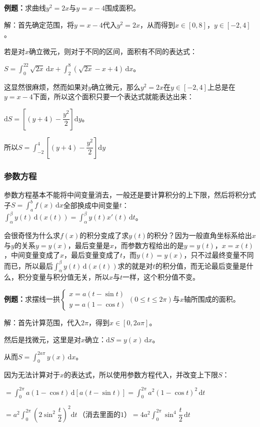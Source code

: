 \documentclass[UTF8, 12pt]{ctexart}
\begin{document}
\textbf{例题：}求曲线$y^2=2x$与$y=x-4$围成面积。

解：首先确定范围，将$y=x-4$代入$y^2=2x$，从而得到$x\in[0,8]$，$y\in[-2,4]$。

若是对$x$确立微元，则对于不同的区间，面积有不同的表达式：

$S=\int_0^22\sqrt{2x}\,\textrm{d}x+\int_2^8(\sqrt{2x}-x+4)\,\textrm{d}x$。

这显然很麻烦，然而如果对$y$确立微元，那么$y^2=2x$在$y\in[-2,4]$上总是在$y=x-4$下面，所以这个面积只要一个表达式就能表达出来：

$\textrm{d}S=\left[(y+4)-\dfrac{y^2}{2}\right]\textrm{d}y$。

所以$S=\displaystyle{\int_{-2}^4\left[(y+4)-\dfrac{y^2}{2}\right]\textrm{d}y}$

\subsubsection{参数方程}

参数方程基本不能将中间变量消去，一般还是要计算积分的上下限，然后将积分式子$S=\int_a^bf(x)\,\textrm{d}x$全部换成中间变量$t$：$\int_\alpha^\beta y(t)\,\textrm{d}(x(t))=\int_\alpha^\beta y(t)x'(t)\,\textrm{d}t$。

会很奇怪为什么求$f(x)$的积分变成了求$y(t)$的积分？因为一般直角坐标系给出$x$与$y$的关系$y=y(x)$，最后变量是$x$，而参数方程给出的是$y=y(t)$，$x=x(t)$，中间变量变成了$x$，最后变量变成了$t$，而$y(t)=y(x)$，只不过最终变量不同而已，所以最后$\int_\alpha^\beta y(t)\,\textrm{d}(x(t))$求的就是对$t$的积分值，而无论最后变量是什么，积分变量与积分值无关，所以$x$与$t$一样，这个积分值不变。

\textbf{例题：}求摆线一拱$\left\{\begin{array}{l}
    x=a(t-\sin t) \\
    y=a(1-\cos t)
\end{array}
\right.$$(0\leqslant t\leqslant 2\pi)$与$x$轴所围成的面积。\medskip

解：首先计算范围，代入$2\pi$，得到$x\in[0,2a\pi]$。

然后是找微元，这里是对$x$确立：$\textrm{d}S=y(x)\,\textrm{d}x$。

从而$S=\int_0^{2a\pi}y(x)\,\textrm{d}x$。

因为无法计算对于$x$的表达式，所以使用参数方程代入，并改变上下限$S$：

$=\int_0^{2\pi}a(1-\cos t)\,\textrm{d}[a(t-\sin t)]=\int_0^{2\pi}a^2(1-\cos t)^2\,\textrm{d}t$

$=a^2\displaystyle{\int_0^{2\pi}\left(2\sin^2\dfrac{t}{2}\right)^2\textrm{d}t}\,\text{（消去里面的1）}=4a^2\displaystyle{\int_0^{2\pi}\sin^4\dfrac{t}{2}\,\textrm{d}t}$
\end{document}
